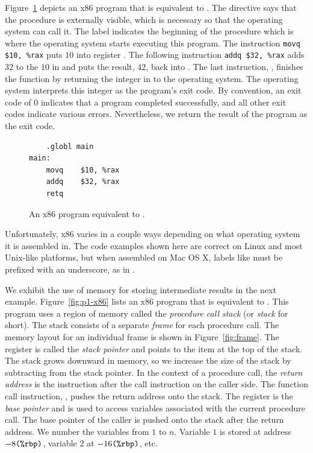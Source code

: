 \documentclass[11pt]{book}
\begin{document}
Figure~\ref{fig:p0-x86} depicts an x86 program that is equivalent
to . The  directive says that the
 procedure is externally visible, which is necessary so
that the operating system can call it. The label 
indicates the beginning of the  procedure which is where
the operating system starts executing this program.  The instruction
\lstinline{movq $10, %rax} puts $10$ into register . The
following instruction \lstinline{addq $32, %rax} adds $32$ to the
$10$ in  and puts the result, $42$, back into
  .
%
The last instruction, , finishes the  function by
returning the integer in  to the operating system. The
operating system interprets this integer as the program's exit
code. By convention, an exit code of 0 indicates that a program
completed successfully, and all other exit codes indicate various
errors.  Nevertheless, we return the result of the program as the exit
code.

\begin{figure}[tbp]
\begin{lstlisting}
	.globl main
main:
	movq	$10, %rax
	addq	$32, %rax
	retq
\end{lstlisting}
\caption{An x86 program equivalent to .}
\label{fig:p0-x86}
\end{figure}

Unfortunately, x86 varies in a couple ways depending on what operating
system it is assembled in. The code examples shown here are correct on
Linux and most Unix-like platforms, but when assembled on Mac OS X,
labels like  must be prefixed with an underscore, as in
.

We exhibit the use of memory for storing intermediate results in the
next example.  Figure~\ref{fig:p1-x86} lists an x86 program that is
equivalent to . This program uses a region of
memory called the \emph{procedure call stack} (or \emph{stack} for
short).  The stack consists
of a separate \emph{frame} for each procedure call. The
memory layout for an individual frame is shown in
Figure~\ref{fig:frame}.  The register  is called the
\emph{stack pointer} and points to the item at
the top of the stack. The stack grows downward in memory, so we
increase the size of the stack by subtracting from the stack pointer.
In the context of a procedure call, the \emph{return
  address} is the instruction after the call
instruction on the caller side. The function call instruction,
, pushes the return address onto the stack.  The register
 is the \emph{base pointer} and is used
to access variables associated with the current procedure call.  The
base pointer of the caller is pushed onto the stack after the return
address. We number the variables from $1$ to $n$. Variable $1$ is
stored at address $-8\texttt{(\%rbp)}$, variable $2$ at
$-16\texttt{(\%rbp)}$, etc.
\end{document}
